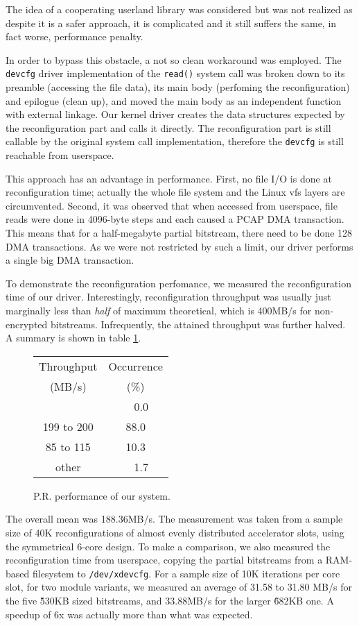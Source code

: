 The idea of a cooperating userland library was considered but was not realized as despite it is a safer approach,
it is complicated and it still suffers the same, in fact worse, performance penalty.

In order to bypass this obstacle, a not so clean workaround was employed. The \texttt{devcfg} driver implementation of the \texttt{read()} system call
was broken down to its preamble (accessing the file data), its main body (perfoming the reconfiguration) and epilogue (clean up), and moved the main body
as an independent function with external linkage. Our kernel driver creates the data structures expected by the reconfiguration part and calls it directly.
The reconfiguration part is still callable by the original system call implementation, therefore the \texttt{devcfg} is still reachable from userspace.

This approach has an advantage in performance. First, no file I/O is done at reconfiguration time; actually the whole 
file system and the Linux \gls{vfs} layers are circumvented. Second, it was observed that when accessed from userspace,
file reads were done in 4096-byte steps and each caused a PCAP DMA transaction. This means that for a half-megabyte partial bitstream,
there need to be done 128 DMA transactions. As we were not restricted by such a limit, our driver performs a single big DMA transaction.

To demonstrate the reconfiguration perfomance, we measured the reconfiguration time of our driver. Interestingly, reconfiguration
throughput was usually just marginally less than {\em half} of maximum theoretical, which is 400MB/s for non-encrypted bitstreams.
Infrequently, the attained throughput was further halved. A summary is shown in table \ref{tab:pr-perf}.

\begin{figure}[H]
\centering
\begin{tabular}{cc}
\toprule
Throughput	& Occurrence\\
(MB/s)		& (\%)	\\
\midrule
\geq 200 	& ~~0.0	\\
199 to 200	& 88.0	\\
85 to 115	& 10.3	\\
other		& ~~1.7	\\
\bottomrule
\end{tabular}
\caption{P.R. performance of our system.}
\label{tab:pr-perf}
\end{figure}

The overall mean was 188.36MB/s.
The measurement was taken from a sample size of 40K reconfigurations of almost evenly distributed accelerator slots, using the symmetrical 6-core design.
To make a comparison, we also measured the reconfiguration time from userspace,
copying the partial bitstreams from a RAM-based filesystem to \texttt{/dev/xdevcfg}.
For a sample size of 10K iterations per core slot, for two module variants, we measured an average of 31.58 to 31.80 MB/s for the five \~530KB sized bitstreams,
and 33.88MB/s for the larger \~682KB one. A speedup of 6x was actually more than what was expected.




